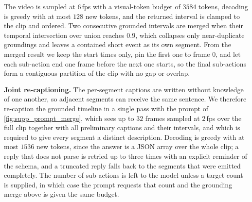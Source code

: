 \noindent
The video is sampled at $6$\,fps with a visual-token budget of $3584$ tokens,
decoding is greedy with at most $128$ new tokens, and the returned interval is
clamped to the clip and ordered.  Two consecutive grounded intervals are merged
when their temporal intersection over union reaches $0.9$, which collapses only
near-duplicate groundings and leaves a contained short event as its own segment.
From the merged result we keep the start times only, pin the first one to frame
$0$, and let each sub-action end one frame before the next one starts, so the
final sub-actions form a contiguous partition of the clip with no gap or
overlap.

\noindent\textbf{Joint re-captioning.}
The per-segment captions are written without knowledge of one another, so
adjacent segments can receive the same sentence.  We therefore re-caption the
grounded timeline in a single pass with the prompt of
\cref{fig:supp_prompt_merge}, which sees up to $32$ frames sampled at $2$\,fps
over the full clip together with all preliminary captions and their intervals,
and which is required to give every segment a distinct description.  Decoding is
greedy with at most $1536$ new tokens, since the answer is a JSON array over the
whole clip; a reply that does not parse is retried up to three times with an
explicit reminder of the schema, and a truncated reply falls back to the
segments that were emitted completely.  The number of sub-actions is left to the
model unless a target count is supplied, in which case the prompt requests that
count and the grounding merge above is given the same budget.

